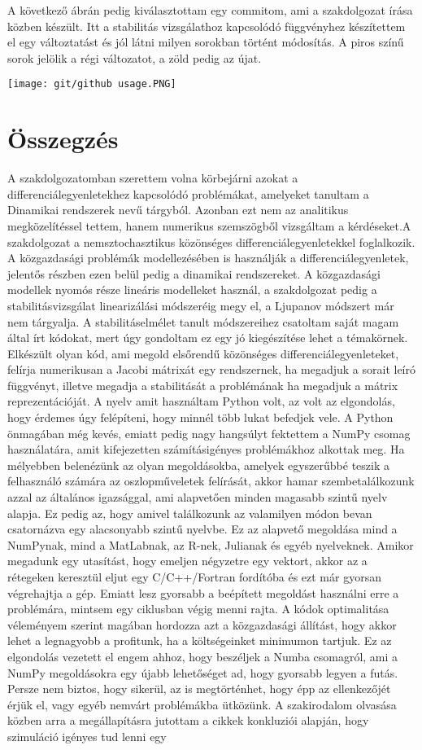 \documentclass{article}
\theoremstyle{definition}
\theoremstyle{theorem}
\begin{document}
A következő ábrán pedig kiválasztottam egy commitom, ami a szakdolgozat írása közben készült. Itt a stabilitás vizsgálathoz kapcsolódó függvényhez készítettem el egy változtatást és jól látni milyen sorokban történt módosítás. A piros színű sorok jelölik a régi változatot, a zöld pedig  az újat.
\begin{center}
    \texttt{[image: git/github usage.PNG]}
\end{center}
\section{Összegzés}
A szakdolgozatomban szerettem volna körbejárni azokat a differenciálegyenletekhez kapcsolódó problémákat, amelyeket tanultam a Dinamikai rendszerek nevű tárgyból. Azonban ezt nem az analitikus megközelítéssel tettem, hanem  numerikus szemszögből vizsgáltam a kérdéseket.A szakdolgozat a nemsztochasztikus közönséges differenciálegyenletekkel foglalkozik. A közgazdasági problémák modellezésében is használják a differenciálegyenletek, jelentős részben ezen belül pedig a dinamikai rendszereket. A közgazdasági modellek nyomós része lineáris modelleket használ, a szakdolgozat pedig a stabilitásvizsgálat linearizálási módszeréig megy el, a Ljupanov módszert már nem tárgyalja. A stabilitáselmélet tanult módszereihez csatoltam saját magam által írt kódokat, mert úgy gondoltam ez egy jó kiegészítése lehet a témakörnek. Elkészült olyan kód, ami megold elsőrendű közönséges differenciálegyenleteket, felírja numerikusan a Jacobi mátrixát egy rendszernek, ha megadjuk a sorait leíró függvényt, illetve megadja a stabilitását a problémának ha megadjuk a mátrix reprezentációját. A nyelv amit használtam Python volt, az volt az elgondolás, hogy érdemes úgy felépíteni, hogy minnél több lukat befedjek vele. A Python önmagában még kevés, emiatt pedig nagy hangsúlyt fektettem a NumPy csomag használatára, amit kifejezetten számításigényes problémákhoz alkottak meg. Ha mélyebben belenézünk az olyan megoldásokba, amelyek egyszerűbbé teszik a felhasználó számára az oszlopműveletek felírását, akkor hamar szembetalálkozunk azzal az általános igazsággal, ami alapvetően minden magasabb szintű nyelv alapja. Ez pedig az, hogy amivel találkozunk az valamilyen módon bevan csatornázva egy alacsonyabb szintű nyelvbe. Ez az alapvető megoldása mind a NumPynak, mind a MatLabnak, az R-nek, Julianak és egyéb nyelveknek. Amikor megadunk egy utasítást, hogy emeljen négyzetre egy vektort, akkor az a rétegeken keresztül eljut egy C/C++/Fortran fordítóba és ezt már gyorsan végrehajtja a gép. Emiatt lesz gyorsabb a beépített megoldást használni erre a problémára, mintsem egy ciklusban végig menni rajta. A kódok optimalitása véleményem szerint magában hordozza azt a közgazdasági állítást, hogy akkor lehet a legnagyobb a profitunk, ha a költségeinket minimumon tartjuk.  Ez az elgondolás vezetett el engem ahhoz, hogy beszéljek a Numba csomagról, ami a NumPy megoldásokra egy újabb lehetőséget ad, hogy gyorsabb legyen a futás. Persze nem biztos, hogy sikerül, az is megtörténhet, hogy épp az ellenkezőjét érjük el, vagy egyéb nemvárt problémákba ütközünk. A szakirodalom olvasása közben arra a megállapításra jutottam a cikkek konkluziói alapján, hogy szimuláció igényes tud lenni egy 
\end{document}
